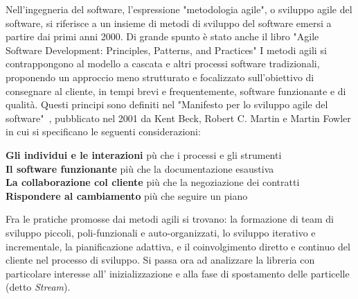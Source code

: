 Nell'ingegneria del software, l'espressione "metodologia agile", o sviluppo agile del software, si riferisce a un insieme di metodi di sviluppo del software emersi a partire dai primi anni 2000. Di grande spunto \`e stato anche il libro "Agile Software Development: Principles, Patterns, and Practices"\cite{AG:02} I metodi agili si contrappongono al modello a cascata e altri processi software tradizionali, proponendo un approccio meno strutturato e focalizzato sull'obiettivo di consegnare al cliente, in tempi brevi e frequentemente, software funzionante e di qualit\`a.
Questi principi sono definiti nel "Manifesto per lo sviluppo agile del software"~\cite{agile2001},
pubblicato nel 2001 da Kent Beck, Robert C. Martin e Martin Fowler in cui si specificano le seguenti considerazioni:\\
\begin{center}
	\textbf{Gli individui e le interazioni} p\`u che i processi e gli strumenti\\
	\textbf{Il software funzionante} pi\`u che la documentazione esaustiva\\
	\textbf{La collaborazione col cliente} pi\`u che la negoziazione dei contratti\\
	\textbf{Rispondere al cambiamento} pi\`u che seguire un piano\\
\end{center}

Fra le pratiche promosse dai metodi agili si trovano: la formazione di team di sviluppo piccoli, poli-funzionali e auto-organizzati, lo sviluppo iterativo e incrementale, la pianificazione adattiva, e il coinvolgimento diretto e continuo del cliente nel processo di sviluppo. 
Si passa ora ad analizzare la libreria con particolare interesse all' inizializzazione e alla fase di spostamento delle particelle (detto \textit{Stream}).